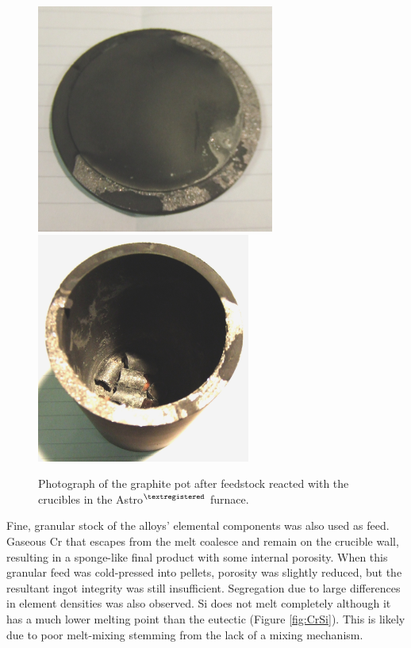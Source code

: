 %
\begin{figure}[H]
\begin{center}
\includegraphics[width=7.8cm]{dirtypotlid}
\includegraphics[width=7cm]{dirtypot}
\caption{Photograph of the graphite pot after feedstock reacted with the crucibles in the Astro$^{\textregistered}$ furnace.}
\label{fig:dirtypot}
\end{center}
\end{figure}
%

Fine, granular stock of the alloys' elemental components was also used as feed.  Gaseous Cr that escapes from the melt coalesce and remain on the crucible wall, resulting in a sponge-like final product with some internal porosity.  When this granular feed was cold-pressed into pellets, porosity was slightly reduced, but the resultant ingot integrity was still insufficient.  Segregation due to large differences in element densities was also observed.  Si does not melt completely although it has a much lower melting point than the eutectic (Figure \ref{fig:CrSi}).  This is likely due to poor melt-mixing stemming from the lack of a mixing mechanism. 

